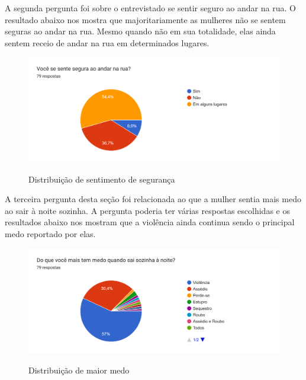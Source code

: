 A segunda pergunta foi sobre o entrevistado se sentir seguro ao andar na rua. O resultado abaixo nos mostra que majoritariamente as mulheres não se sentem seguras ao andar na rua. Mesmo quando não em sua totalidade, elas ainda sentem receio de andar na rua em determinados lugares. 
\begin{figure}[h]
  \begin{center}
  \includegraphics[width=1.0\linewidth]{images/distribuicao-seguranca-rua.png}\\
  \end{center}
  \caption[Distribuição de sentimento de segurança]{Distribuição de sentimento de segurança}
  \label{fig:mapa-empatia=inicial}
\end{figure}
\clearpage

A terceira pergunta desta seção foi relacionada ao que a mulher sentia mais medo ao sair à noite sozinha. A pergunta poderia ter várias respostas escolhidas e os resultados abaixo nos mostram que a violência ainda continua sendo o principal medo reportado por elas.
\begin{figure}[h]
  \begin{center}
  \includegraphics[width=1.0\linewidth]{images/distribuicao-medo.png}\\
  \end{center}
  \caption[Distribuição de maior medo]{Distribuição de maior medo}
  \label{fig:mapa-empatia=inicial}
\end{figure}
\clearpage

